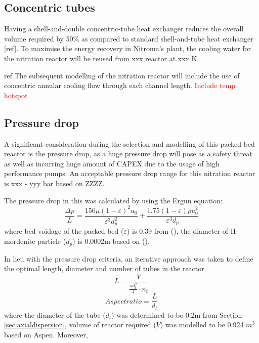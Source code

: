 \subsection{Concentric tubes}
Having a shell-and-double concentric-tube heat exchanger reduces the overall volume required by 50\% as compared to standard shell-and-tube heat exchanger [ref].
To maximise the energy recovery in Nitroma's plant, the cooling water for the nitration reactor will be reused from xxx reactor at xxx K. 

ref
The subsequent modelling of the nitration reactor will include the use of concentric annular cooling flow through each channel length. 
\textcolor{red}{Include temp hotspot}

\subsection{Pressure drop}

A significant consideration during the selection and modelling of this packed-bed reactor is the pressure drop, as a huge pressure drop will pose as a safety threat as well as incurring huge amount of CAPEX due to the usage of high performance pumps. An acceptable pressure drop range for this nitration reactor is xxx - yyy bar based on ZZZZ. 

The pressure drop in this was calculated by using the Ergun equation: 
\begin{equation}
    \frac{\Delta p}{L} = \frac{150 \mu (1- \varepsilon)^2 u_0}{\varepsilon^3 d_p^2} + \frac{1.75(1-\varepsilon)\rho u_0^2}{\varepsilon^3 d_p}
    \label{eqn:ergun}
\end{equation}
where bed voidage of the packed bed ($\varepsilon$) is 0.39 from (), the diameter of H-mordenite particle ($d_p$) is 0.0002m based on (). 

In lieu with the pressure drop criteria, an iterative approach was taken to define the optimal length, diameter and number of tubes in the reactor. 
\begin{equation}
    L= \frac{V}{\frac{\pi d_t^2}{4}\cdot n_t}
    \label{eqn:pressuredrop}
\end{equation}
\begin{equation}
    Aspect ratio = \frac{L}{d_t}
    \label{eqn:aspectratio}
\end{equation}
where the diameter of the tube ($d_t$) was determined to be 0.2m from Section \ref{sec:axialdispersion}, volume of reactor required ($V$) was modelled to be 0.924 $m^3$ based on Aspen. Moreover, 

